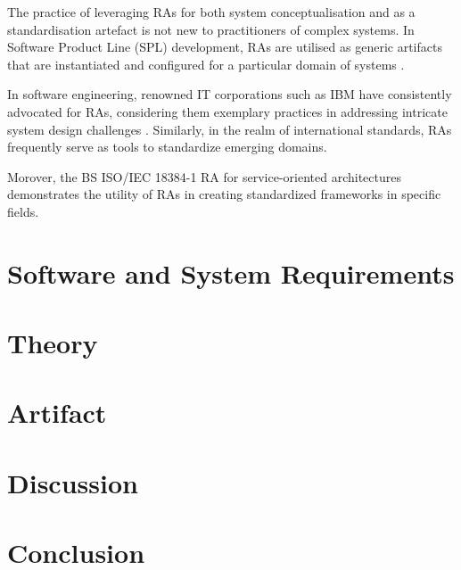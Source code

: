 \documentclass[preprint,12pt]{elsarticle}
\begin{document}
The practice of leveraging RAs for both system conceptualisation and as a standardisation artefact is not new to practitioners of complex systems. In Software Product Line (SPL) development, RAs are utilised as generic artifacts that are instantiated and configured for a particular domain of systems \cite{Derras}. 

In software engineering, renowned IT corporations such as IBM have consistently advocated for RAs, considering them exemplary practices in addressing intricate system design challenges \cite{Cloutier2010}. Similarly, in the realm of international standards, RAs frequently serve as tools to standardize emerging domains. 

Morover, the BS ISO/IEC 18384-1 RA for service-oriented architectures \cite{Iso18384-1} demonstrates the utility of RAs in creating standardized frameworks in specific fields.

\section{Software and System Requirements}
\label{sec:software_and_system_requirements}

\section{Theory}
\label{sec:theory}

\section{Artifact}
\label{sec:artifact}

\section{Discussion}
\label{sec:discussion}

\section{Conclusion}
\label{sec:conclusion}




\appendix






 
\end{document}
